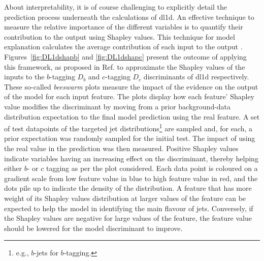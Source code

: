 About interpretability, it is of course challenging to explicitly detail the prediction process underneath the calculations of \gls{dl1d}. An effective technique to measure the relative importance of the different variables is to quantify their contribution to the output using Shapley values. This technique for model explanation calculates the average contribution of each input to the output \cite{Rozemberczki2022TheSV}. Figures~\ref{fig:DL1dshapb} and \ref{fig:DL1dshapc} present the outcome of applying this framework, as proposed in Ref. \cite{NIPS2017_7062} to approximate the Shapley values of the inputs to the $b$-tagging $D_b$ and $c$-tagging $D_c$ discriminants of \gls{dl1d} respectively. These so-called \textit{beeswarm} plots measure the impact of the evidence on the output of the model for each input feature. The plots display how each feature' Shapley value modifies the discriminant by moving from a prior background-data distribution expectation to the final model prediction using the real feature. A set of test datapoints of the targeted jet distributions\footnote{e.g., $b$-jets for $b$-tagging.} are sampled and, for each, a prior expectation was randomly sampled for the initial test. The impact of using the real value in the prediction was then measured. Positive Shapley values indicate variables having an increasing effect on the discriminant, thereby helping either $b$- or $c$ tagging as per the plot considered. Each data point is coloured on a gradient scale from low feature value in blue to high feature value in red, and the dots pile up to indicate the density of the distribution. A feature that has more weight of its Shapley values distribution at larger values of the feature can be expected to help the model in identifying the main flavour of jets. Conversely, if the Shapley values are negative for large values of the feature, the feature value should be lowered for the model discriminant to improve.

